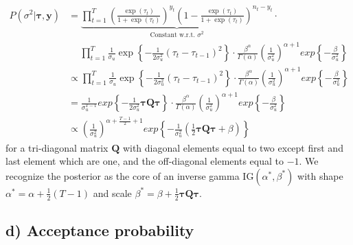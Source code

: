 \documentclass[
]{article}
\begin{document}
\[
\begin{aligned}
  P(\sigma^2 | \boldsymbol{\tau}, \boldsymbol{y}) &= \underbrace{\prod_{t=1}^{T} \left(\frac{\exp(\tau_t)}{1+\exp(\tau_t)}\right)^{y_t}
  \left( 1- \frac{\exp(\tau_t)}{1+\exp(\tau_t)}\right)^{n_t - y_t}}_{\text{Constant w.r.t. }\sigma^2}\cdot \\
  &\quad \ \prod_{t=1}^{T} \frac{1}{\sigma_u} \exp\left\{ -\frac{1}{2\sigma^2_u}(\tau_t - \tau_{t-1})^2 \right\} \cdot \frac{\beta^\alpha}{\Gamma(\alpha)} \left( \frac{1}{\sigma_u^2} \right)^{\alpha+1} exp\left\{ - \frac{\beta}{\sigma_u^2} \right\}
  \\
  &\propto \prod_{t=1}^{T} \frac{1}{\sigma_u} \exp\left\{ -\frac{1}{2\sigma^2_u}(\tau_t - \tau_{t-1})^2 \right\} \cdot \frac{\beta^\alpha}{\Gamma(\alpha)} \left( \frac{1}{\sigma_u^2} \right)^{\alpha+1} exp\left\{ - \frac{\beta}{\sigma_u^2} \right\}
  \\
  &= \frac{1}{\sigma^{T-1}_u} exp\left\{ -\frac{1}{2\sigma^2_u} \boldsymbol{\tau Q \tau} \right\} \cdot \frac{\beta^\alpha}{\Gamma(\alpha)} \left( \frac{1}{\sigma_u^2} \right)^{\alpha+1} exp\left\{ - \frac{\beta}{\sigma_u^2} \right\}
  \\
  &\propto \left( \frac{1}{\sigma_u^2} \right)^{\alpha+\frac{T-1}{2} + 1} 
  exp\left\{ -\frac{1}{\sigma^2_u} \left( \frac12 \boldsymbol{\tau Q \tau} + \beta \right)  \right\}
\end{aligned}
\]
for a tri-diagonal matrix \(\boldsymbol{Q}\) with diagonal elements equal to two except first and last element which are one, and the off-diagonal elements equal to \(-1\). We recognize the posterior as the core of an inverse gamma \(\mathrm{IG}(\alpha^*, \beta^*)\) with shape \(\alpha^* = \alpha + \frac12(T-1)\) and scale \(\beta^* = \beta + \frac12 \boldsymbol{\tau Q \tau}\).

\hypertarget{sec:1d}{%
\subsection{d) Acceptance probability}\label{sec:1d}}
\end{document}
